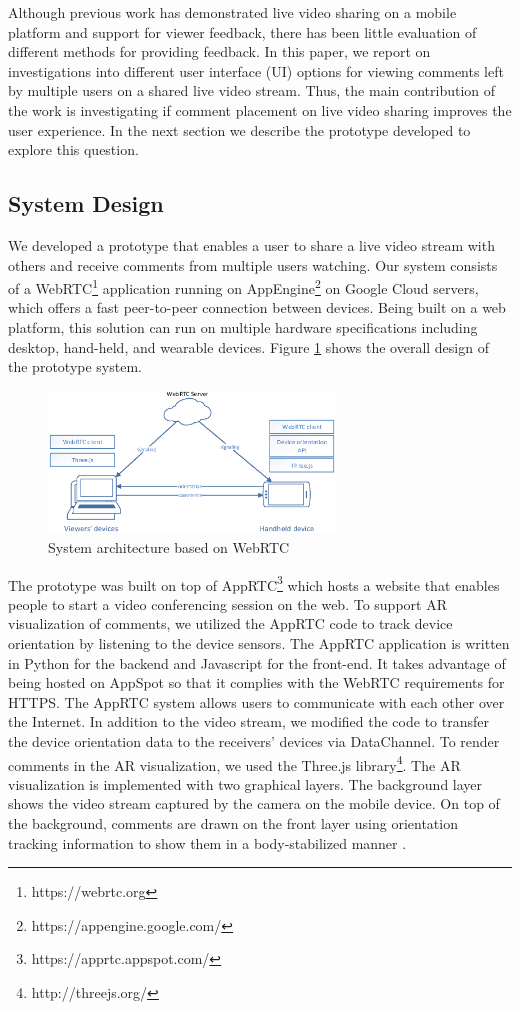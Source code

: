Although previous work has demonstrated live video sharing on a mobile platform and support for viewer feedback, there has been little evaluation of different methods for providing feedback. In this paper, we report on investigations into different user interface (UI) options for viewing comments left by multiple users on a shared live video stream. Thus, the main contribution of the work is investigating if comment placement on live video sharing improves the user experience. In the next section we describe the prototype developed to explore this question.

\subsection{System Design}

We developed a prototype that enables a user to share a live video stream with others and receive comments from multiple users watching. Our system consists of a WebRTC\footnote{https://webrtc.org} application running on AppEngine\footnote{https://appengine.google.com/} on Google Cloud servers, which offers a fast peer-to-peer connection between devices. Being built on a web platform, this solution can run on multiple hardware specifications including desktop, hand-held, and wearable devices. Figure \ref{fig:mgia16:system} shows the overall design of the prototype system.

\begin{figure}[ht]
  \centering
  \includegraphics[width=3in]{images/mgia16/system}
  \caption{System architecture based on WebRTC}
	\label{fig:mgia16:system}
\end{figure}

The prototype was built on top of AppRTC\footnote{https://apprtc.appspot.com/} which hosts a website that enables people to start a video conferencing session on the web. To support AR visualization of comments, we utilized the AppRTC code to track device orientation by listening to the device sensors. The AppRTC application is written in Python for the backend and Javascript for the front-end. It takes advantage of being hosted on AppSpot so that it complies with the WebRTC requirements for HTTPS. The AppRTC system allows users to communicate with each other over the Internet. In addition to the video stream, we modified the code to transfer the device orientation data to the receivers' devices via DataChannel. To render comments in the AR visualization, we used the Three.js library\footnote{http://threejs.org/}. The AR visualization is implemented with two graphical layers. The background layer shows the video stream captured by the camera on the mobile device. On top of the background, comments are drawn on the front layer using orientation tracking information to show them in a body-stabilized manner \cite{Billinghurst1998}. 


